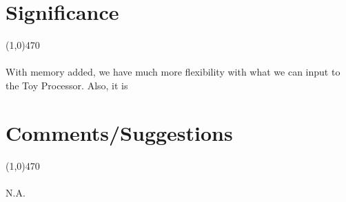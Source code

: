 \documentclass[12pt]{article}
\begin{document}
	\newpage
\section{Significance} \vspace{-.7cm} \line(1,0){470}
	\paragraph{} 
		With memory added, we have much more flexibility with what we can input to the Toy Processor. Also, it is 

 \section{Comments/Suggestions}\vspace{-.7cm} \line(1,0){470}
 	\paragraph{} 
 		N.A.
		
\end{document}
